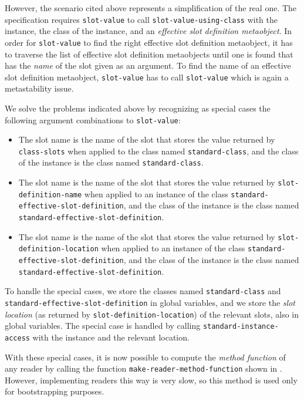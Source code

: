However, the scenario cited above represents a simplification of the
real one.  The specification requires \texttt{slot-value} to call
\texttt{slot-value-using-class} with the instance, the class of the
instance, and an \emph{effective slot definition metaobject}.  In
order for \texttt{slot-value} to find the right effective slot
definition metaobject, it has to traverse the list of effective slot
definition metaobjects until one is found that has the \emph{name} of
the slot given as an argument.  To find the name of an effective slot
definition metaobject, \texttt{slot-value} has to call
\texttt{slot-value} which is again a metastability issue. 

We solve the problems indicated above%
by recognizing as special cases
the following argument combinations to \texttt{slot-value}:

\begin{itemize}
\item The slot name is the name of the slot that stores the value
  returned by \texttt{class-slots} when applied to the class named
  \texttt{standard-class}, and the class of the instance is the class
  named \texttt{standard-class}.
\item The slot name is the name of the slot that stores the value
  returned by \texttt{slot-definition-name} when applied to an
  instance of the class \texttt{standard-effective-slot-definition},
  and the class of the instance is the class named
  \texttt{standard-effective-slot-definition}. 
\item The slot name is the name of the slot that stores the value
  returned by \texttt{slot-definition-location} when applied to an
  instance of the class \texttt{standard-effective-slot-definition},
  and the class of the instance is the class named
  \texttt{standard-effective-slot-definition}. 
\end{itemize}

To handle the special cases, we store the classes named
\texttt{standard-class} and
\texttt{standard-effective-slot-definition} in global variables, and
we store the \emph{slot location} (as returned by
\texttt{slot-definition-location}) of the relevant slots, also in
global variables.  The special case is handled by calling
\texttt{standard-instance-access} with the instance and the relevant
location.

With these special cases, it is now possible to compute the
\emph{method function} of any reader by calling the function
\texttt{make-reader-method-function} shown in
.  However, implementing readers this way is
very slow, so this method is used only for bootstrapping purposes.

